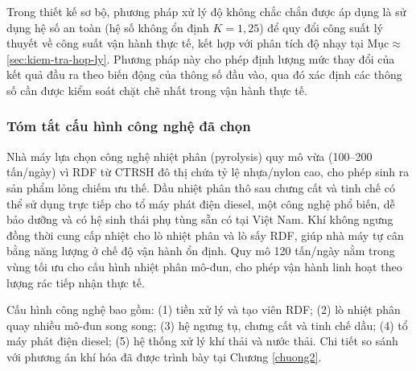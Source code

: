 \documentclass[../main.tex]{subfiles}
\begin{document}
Trong thiết kế sơ bộ, phương pháp xử lý độ không chắc chắn được áp dụng là sử dụng hệ số an toàn (hệ số không ổn định $K = 1{,}25$) để quy đổi công suất lý thuyết về công suất vận hành thực tế, kết hợp với phân tích độ nhạy tại Mục$\approx$\ref{sec:kiem-tra-hop-ly}. Phương pháp này cho phép định lượng mức thay đổi của kết quả đầu ra theo biến động của thông số đầu vào, qua đó xác định các thông số cần được kiểm soát chặt chẽ nhất trong vận hành thực tế.

\subsubsection{Tóm tắt cấu hình công nghệ đã chọn}
\label{sec:co-so-chon-cong-nghe}

Nhà máy lựa chọn công nghệ nhiệt phân (pyrolysis) quy mô vừa (100--200 tấn/ngày) vì RDF từ CTRSH đô thị chứa tỷ lệ nhựa/nylon cao, cho phép sinh ra sản phẩm lỏng chiếm ưu thế. Dầu nhiệt phân thô sau chưng cất và tinh chế có thể sử dụng trực tiếp cho tổ máy phát điện diesel, một công nghệ phổ biến, dễ bảo dưỡng và có hệ sinh thái phụ tùng sẵn có tại Việt Nam. Khí không ngưng đồng thời cung cấp nhiệt cho lò nhiệt phân và lò sấy RDF, giúp nhà máy tự cân bằng năng lượng ở chế độ vận hành ổn định. Quy mô 120 tấn/ngày nằm trong vùng tối ưu cho cấu hình nhiệt phân mô-đun, cho phép vận hành linh hoạt theo lượng rác tiếp nhận thực tế.

Cấu hình công nghệ bao gồm: (1) tiền xử lý và tạo viên RDF; (2) lò nhiệt phân quay nhiều mô-đun song song; (3) hệ ngưng tụ, chưng cất và tinh chế dầu; (4) tổ máy phát điện diesel; (5) hệ thống xử lý khí thải và nước thải. Chi tiết so sánh với phương án khí hóa đã được trình bày tại Chương \ref{chuong2}.
\end{document}
